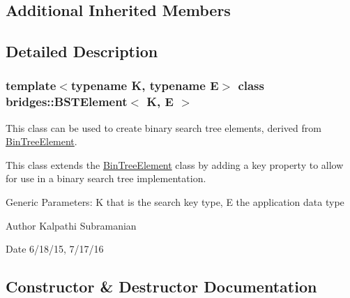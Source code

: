\subsection*{Additional Inherited Members}


\subsection{Detailed Description}
\subsubsection*{template$<$typename K, typename E$>$\newline
class bridges\+::\+B\+S\+T\+Element$<$ K, E $>$}

This class can be used to create binary search tree elements, derived from \mbox{\hyperlink{classbridges_1_1_bin_tree_element}{Bin\+Tree\+Element}}. 

This class extends the \mbox{\hyperlink{classbridges_1_1_bin_tree_element}{Bin\+Tree\+Element}} class by adding a key property to allow for use in a binary search tree implementation.

Generic Parameters\+: K that is the search key type, E the application data type

\begin{DoxyAuthor}{Author}
Kalpathi Subramanian 
\end{DoxyAuthor}
\begin{DoxyDate}{Date}
6/18/15, 7/17/16 
\end{DoxyDate}


\subsection{Constructor \& Destructor Documentation}
\mbox{\label{classbridges_1_1_b_s_t_element_aff7dbbb4011e85ea492d9a0c921895c5}} 
